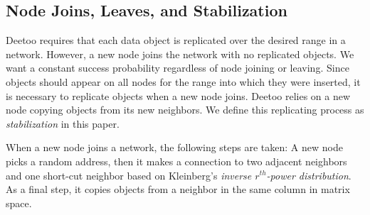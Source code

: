 \documentclass[conference]{IEEEtran}
\begin{document}
\subsection{Node Joins, Leaves, and Stabilization}\label{sec:join}
Deetoo requires that each data object is replicated over the desired 
range in a network. However, a new node joins the network with no replicated 
objects. 
We want a constant success probability regardless of node joining or leaving.
Since objects should appear on all nodes for the range into which they were
inserted, it is necessary to replicate objects when a new node joins.
Deetoo relies on a new node copying objects from its new neighbors. 
We define this replicating process as \emph{stabilization} in this paper.

When a new node joins a network, the following steps are taken:
A new node picks a random address, then it makes a connection to two adjacent
neighbors and one short-cut neighbor based on Kleinberg's
\emph{inverse $r^{th}$-power distribution}. As a final step, it copies objects 
from a neighbor in the same column in matrix space.
\end{document}
